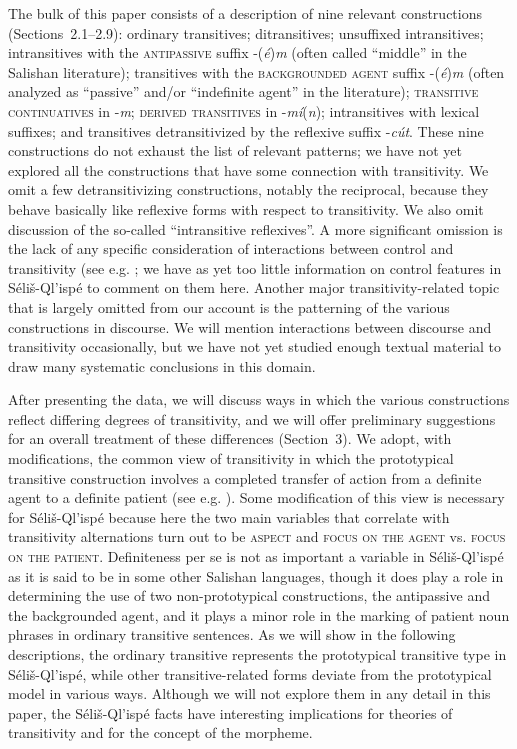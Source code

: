 \documentclass[output=paper,colorlinks,citecolor=brown]{langscibook}
\begin{document}
  The bulk of this paper consists of a description of nine relevant
  constructions (Sections~2.1--2.9): ordinary transitives; ditransitives;
  unsuffixed intransitives; intransitives with the
  \textsc{antipassive} suffix -(\emph{\'e})\emph{m} (often called
  ``middle'' in the Salishan literature); transitives with the
  \textsc{backgrounded agent} suffix -(\emph{\'e})\emph{m} (often
  analyzed as ``passive'' and/or ``indefinite agent'' in the
  literature); \textsc{transitive continuatives} in -\emph{m};
  \textsc{derived transitives} in -\emph{m\'i}(\emph{n});
  intransitives with lexical suffixes; and transitives
  detransitivized by the reflexive suffix -\emph{c\'ut}.  These nine
  constructions do not exhaust the list of relevant patterns; we have
  not yet explored all the constructions that have some connection
  with transitivity.  We omit a few detransitivizing constructions,
  notably the reciprocal, because they behave basically like
  reflexive forms with respect to transitivity.  We also omit
  discussion of the so-called ``intransitive reflexives''.  A more
  significant omission is the lack of any specific consideration of
  interactions between control and transitivity (see
  e.g. \cite{Thompson:1985}; we have as yet too little information
  on control features in S\'eli\v{s}-Ql'isp\'e to comment on them
  here.  Another major transitivity-related topic that is largely
  omitted from our account is the patterning of the various
  constructions in discourse.  We will mention interactions between
  discourse and transitivity occasionally, but we have not yet
  studied enough textual material to draw many systematic conclusions
  in this domain.


  After presenting the data, we will discuss ways in which the
  various constructions reflect differing degrees of transitivity,
  and we will offer preliminary suggestions for an overall treatment
  of these differences (Section~3).  We adopt, with modifications, the
  common view of transitivity in which the prototypical transitive
  construction involves a completed transfer of action from a
  definite agent to a definite patient (see
  e.g. \cite{Hopper&Thompson:1980}).  Some modification of this view is
  necessary for
  S\'eli\v{s}-Ql'isp\'e because here the two main variables that
  correlate with transitivity alternations turn out to be \textsc{     aspect} and \textsc{focus on the agent} vs. \textsc{focus on the
    patient}.  Definiteness per se is not as important a variable in
  S\'eli\v{s}-Ql'isp\'e as it is said to be in some other Salishan
  languages, though it does play a role in determining the use of two
  non-prototypical constructions, the antipassive and the
  backgrounded agent, and it plays a minor role in the marking of
  patient noun phrases in ordinary transitive sentences.  As we will
  show in the following descriptions, the ordinary transitive
  represents the prototypical transitive type in
  S\'eli\v{s}-Ql'isp\'e, while other transitive-related forms deviate
  from the prototypical model in various ways.  Although we will not
  explore them in any detail in this paper, the S\'eli\v{s}-Ql'isp\'e
  facts have interesting implications for theories of transitivity
  and for the concept of the morpheme.
\end{document}
